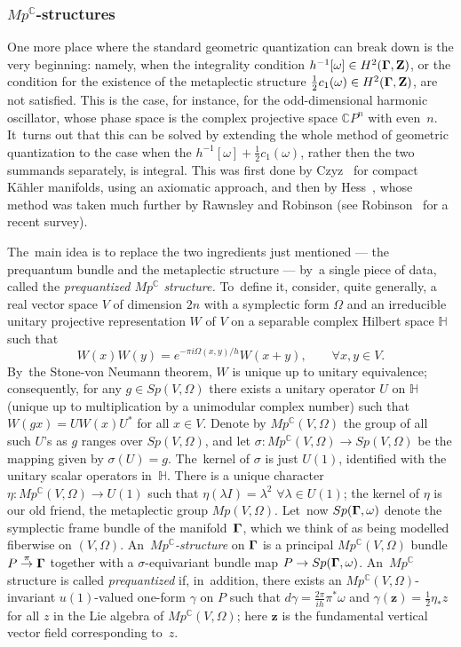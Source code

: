 \documentclass[11pt]{amsart}
\numberwithin{equation}{section}
\theoremstyle{remark}
\let\Bbb\mathbb \let\Cal\mathcal \let\frak\mathfrak
\let\boldkey\mathbf \let\bold\mathbf
\newcommand\Omg{{\bigam}}   %
\newcommand\OMEGA{\Omega}
\newcommand\ZZ{\bold Z}
\newcommand{\CC}{\C}
\newcommand{\bigam}{\mbox{\boldmath $\Gamma$}}
\newcommand{\C}{\mathbb C}
\begin{document}
\subsubsection{$Mp^\CC$-structures} \label{sec263}
One more place where the standard geometric quantization can break down is the
very beginning: namely, when the integrality condition $h^{-1}[\omega]\in
H^2(\Omg,\ZZ)$, or the condition for the existence of the metaplectic structure
$\frac12 c_1(\omega)\in H^2(\Omg,\ZZ)$, are not satisfied. This is the case,
for instance, for the odd-dimensional harmonic oscillator, whose phase space is
the complex projective space $\CC P^n$ with even~$n$. It~turns out that this
can be solved by extending the whole method of geometric quantization to the
case when the  $h^{-1}[\omega] + \frac12 c_1(\omega)$, rather
then the two summands separately, is integral. This was first done by
Czyz~\cite{bib:Czyz} for compact K\"ahler manifolds, using an axiomatic
approach, and then by Hess~\cite{bib:Hess}, whose method was taken much further
by Rawnsley and Robinson \cite{bib:RawnRob} (see Robinson~\cite{bib:RobiSURV}
for a recent survey).

The~main idea is to replace the two ingredients just mentioned --- the
prequantum bundle and the metaplectic structure --- by~a single piece of data,
called the {\sl prequantized $Mp^\CC$ structure.\/} To~define it, consider,
quite generally, a real vector space $V$ of dimension $2n$ with a symplectic
form $\OMEGA$ and an irreducible unitary projective representation $W$ of $V$
on a separable complex Hilbert space $\Bbb H$ such that
$$ W(x) W(y) = e^{-\pi i \OMEGA(x,y)/h} W(x+y),  \qquad \forall x,y\in V.  $$
By~the Stone-von Neumann theorem, $W$ is unique up to unitary equivalence;
consequently, for any $g\in Sp(V,\OMEGA)$ there exists a unitary operator $U$
on $\Bbb H$ (unique up to multiplication by a unimodular complex number) such
that $W(gx)=UW(x)U^*$ for all $x\in V$. Denote by $Mp^\CC(V,\OMEGA)$ the group
of all such $U$'s as $g$ ranges over $Sp(V,\OMEGA)$, and let
$\sigma:Mp^\CC(V,\OMEGA)\to Sp(V,\OMEGA)$ be the mapping given by
$\sigma(U)=g$. The~kernel of $\sigma$ is just $U(1)$, identified with the
unitary scalar operators in~$\Bbb H$. There is a unique character $\eta:
Mp^\CC(V,\OMEGA)\to U(1)$ such that $\eta(\lambda I)=\lambda^2$ $\forall\lambda
\in U(1)$; the kernel of $\eta$ is our old friend, the metaplectic group
$Mp(V,\OMEGA)$. Let~now $Sp(\Omg,\omega)$ denote the symplectic frame bundle of
the manifold~$\Omg$, which we think of as being modelled fiberwise on
$(V,\OMEGA)$. An~{\sl $Mp^\CC$-structure\/} on $\Omg$ is a principal
$Mp^\CC(V,\OMEGA)$ bundle $P\overset{\pi}{\to}\Omg$ together with a
$\sigma$-equivariant bundle map $P\to Sp(\Omg,\omega)$. An~$Mp^\CC$ structure
is called {\sl prequantized\/} if, in~addition, there exists an
$Mp^\CC(V,\OMEGA)$-invariant $u(1)$-valued one-form $\gamma$ on $P$ such that
$d\gamma=\frac{2\pi}{ih} \pi^*\omega$ and $\gamma(\boldkey z)=\frac12\eta_*z$
for all $z$ in the Lie algebra of $Mp^\CC(V,\OMEGA)$; here $\boldkey z$ is the
fundamental vertical vector field corresponding to~$z$.
\end{document}
